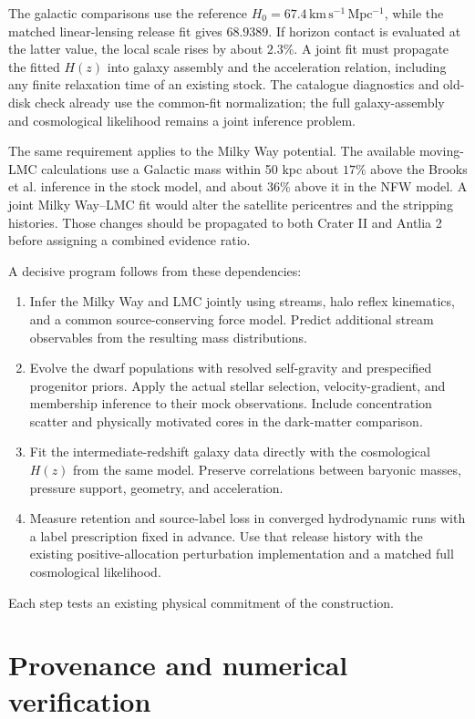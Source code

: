 The galactic comparisons use the reference
$H_0=67.4\,\mathrm{km\,s^{-1}\,Mpc^{-1}}$, while the matched linear-lensing
release fit gives $68.9389$. If horizon contact is evaluated at the latter
value, the local scale rises by about $2.3\%$. A joint fit must propagate
the fitted $H(z)$ into galaxy assembly and the acceleration relation,
including any finite relaxation time of an existing stock. The catalogue diagnostics and old-disk check already use the common-fit
normalization; the full galaxy-assembly and cosmological likelihood remains
a joint inference problem.

The same requirement applies to the Milky Way potential. The available
moving-LMC calculations use a Galactic mass within 50 kpc about $17\%$
above the Brooks et al. inference in the stock model, and about $36\%$
above it in the NFW model. A joint Milky Way--LMC fit would alter the
satellite pericentres and the stripping histories. Those changes should
be propagated to both Crater II and Antlia 2 before assigning a combined
evidence ratio. \cite{brooks}

A decisive program follows from these dependencies:
\begin{enumerate}
\item Infer the Milky Way and LMC jointly using streams, halo reflex
kinematics, and a common source-conserving force model. Predict additional
stream observables from the resulting mass distributions.
\item Evolve the dwarf populations with resolved self-gravity and
prespecified progenitor priors. Apply the actual stellar selection,
velocity-gradient, and membership inference to their mock observations.
Include concentration scatter and physically motivated cores in the
dark-matter comparison.
\item Fit the intermediate-redshift galaxy data directly with the
cosmological $H(z)$ from the same model. Preserve correlations between
baryonic masses, pressure support, geometry, and acceleration.
\item Measure retention and source-label loss in converged hydrodynamic
runs with a label prescription fixed in advance. Use that release history
with the existing positive-allocation perturbation implementation and
a matched full cosmological likelihood.
\end{enumerate}
Each step tests an existing physical commitment of the construction.

\appendix
\section{Provenance and numerical verification}

